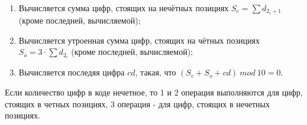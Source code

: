 \begin{enumerate}
\item Вычисляется сумма цифр, стоящих на нечётных позициях $S_e = \sum{d_{2_i + 1}}$ (кроме последней, вычисляемой);
\item Вычисляется утроенная сумма цифр, стоящих на чётных позициях $S_o = 3 \cdot \sum{d_{2_i}}$ (кроме последней, вычисляемой);
\item Вычисляется последяя цифра $cd$, такая, что $(S_e + S_o + cd) \ mod \ 10 = 0$.

\end{enumerate}

Если количество цифр в коде нечетное, то 1 и 2 операция выполняются для цифр,
 стоящих в четных позициях, 3 операция \-- для цифр, стоящих в нечетных позициях.